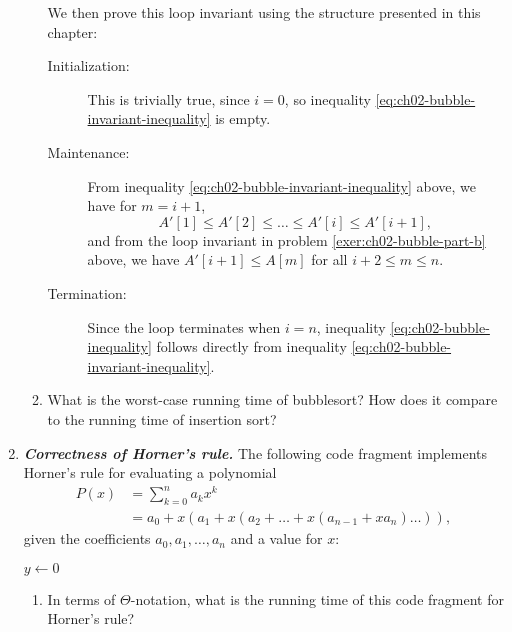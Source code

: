 \documentclass[Chapter02]{subfiles}
\begin{document}
\begin{enumerate}[leftmargin=\labelsep,label={\textbf{\thesection-\arabic*}}]
\begin{enumerate}[resume]
\begin{answer}
				We then prove this loop invariant using the structure presented in this chapter:
				\begin{description}
					\item[Initialization:] This is trivially true, since $i = 0$, so inequality \eqref{eq:ch02-bubble-invariant-inequality} is empty.

					\item[Maintenance:] From inequality \eqref{eq:ch02-bubble-invariant-inequality} above, we have for $m = i + 1$,
					\[
						A'[1] \leq A'[2] \leq \dots \leq A'[i] \leq A'[i + 1],
					\]
					and from the loop invariant in problem \ref{exer:ch02-bubble-part-b} above, we have $A'[i + 1] \leq A[m]$ for all $i + 2 \leq m \leq n$.

					\item[Termination:] Since the loop terminates when $i = n$, inequality \eqref{eq:ch02-bubble-inequality} follows directly from inequality \eqref{eq:ch02-bubble-invariant-inequality}.
				\end{description}
			\end{answer}
			
			\item What is the worst-case running time of bubblesort? How does it compare to the running time of insertion sort?
			\begin{answer}
				
			\end{answer}
			
		\end{enumerate}
		
		\item \textbf{\textit{Correctness of Horner's rule.}} The following code fragment implements Horner's rule for evaluating a polynomial
		\begin{align*}
			P(x) &= \sum_{k = 0}^n a_kx^k\\
				&= a_0 + x(a_1 + x(a_2 + \dots + x(a_{n - 1} + xa_n) \dots)),
		\end{align*}
		given the coefficients $a_0, a_1, \dots, a_n$ and a value for $x$:

		\begin{algorithm}[H]
			$y \leftarrow 0$\;
		\end{algorithm}
		\begin{enumerate}
			\item In terms of $\Theta$-notation, what is the running time of this code fragment for Horner's rule?
			\begin{answer}
				

\end{answer}
\end{enumerate}
\end{enumerate}
\end{document}
